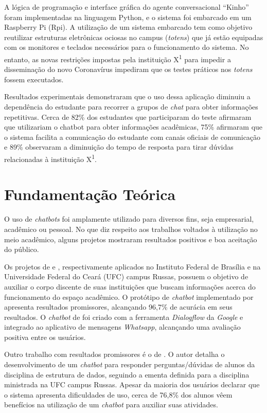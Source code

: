 \documentclass[12pt]{article}
\begin{document}
A lógica de programação e interface gráfica do agente conversacional “Kinho” foram implementadas na linguagem Python, e o sistema foi embarcado em um Raspberry Pi (Rpi). A utilização de um sistema embarcado tem como objetivo reutilizar estruturas eletrônicas ociosas no campus ({\itshape totens}) que já estão equipadas com os monitores e teclados necessários para o funcionamento do sistema. No entanto, as novas restrições impostas pela instituição X\textsuperscript{1} para impedir a disseminação do novo Coronavírus impediram que os testes práticos nos {\itshape totens} fossem executados.

Resultados experimentais demonstraram que o uso dessa aplicação diminuiu a dependência do estudante para recorrer a grupos de {\itshape chat} para obter informações repetitivas. Cerca de 82\% dos estudantes que participaram do teste afirmaram que utilizariam o chatbot para obter informações acadêmicas, 75\% afirmaram que o sistema facilita a comunicação do estudante com canais oficiais de comunicação e 89\% observaram a diminuição do tempo de resposta para tirar dúvidas relacionadas à instituição X\textsuperscript{1}.


\section{ Fundamentação Teórica}

O uso de {\itshape chatbots} foi amplamente utilizado para diversos fins, seja empresarial, acadêmico ou pessoal. No que diz respeito aos trabalhos voltados à utilização no meio acadêmico, alguns projetos mostraram resultados positivos e boa aceitação do público.

Os projetos de \cite{silva:21} e \cite{maciel:19},  respectivamente aplicados no Instituto Federal de Brasília e na Universidade Federal do Ceará (UFC) campus Russas, possuem o objetivo de auxiliar o corpo discente de suas instituições que buscam informações acerca do funcionamento do espaço acadêmico. O protótipo de {\itshape chatbot} implementado por \cite{silva:21} apresenta resultados promissores, alcançando 96,7\% de acurácia em seus resultados. O {\itshape chatbot} de \cite{maciel:19} foi criado com a ferramenta {\itshape Dialogflow} da {\itshape Google} e integrado ao aplicativo de mensagens {\itshape Whatsapp}, alcançando uma avaliação positiva entre os usuários.

Outro trabalho com resultados promissores é o de \cite{araujo:20}. O autor detalha o desenvolvimento de um {\itshape chatbot} para responder perguntas/dúvidas de alunos da disciplina de estrutura de dados, seguindo a ementa definida para a disciplina ministrada na UFC campus Russas. Apesar da maioria dos usuários declarar que o sistema apresenta dificuldades de uso, cerca de 76,8\% dos alunos vêem benefícios na utilização de um {\itshape chatbot} para auxiliar suas atividades.
\end{document}
